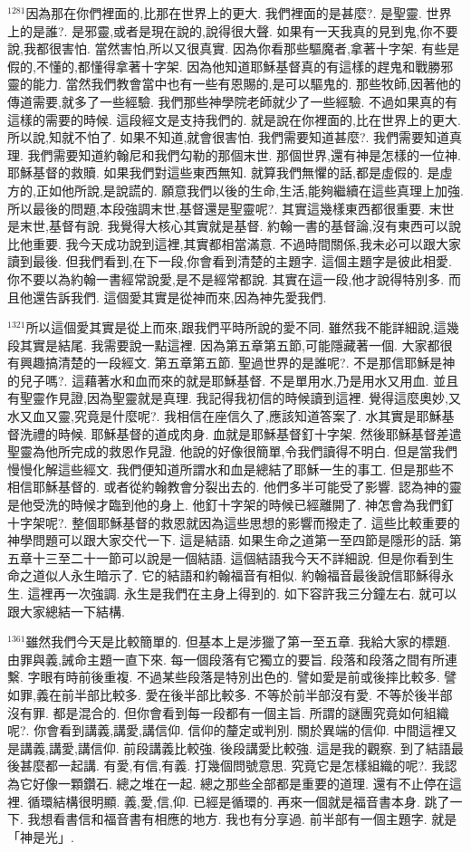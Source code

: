 \documentclass{book}
\begin{document}
$^{1281}$因為那在你們裡面的,比那在世界上的更大.
我們裡面的是甚麼?.
是聖靈.
世界上的是誰?.
是邪靈,或者是現在說的,說得很大聲.
如果有一天我真的見到鬼,你不要說,我都很害怕.
當然害怕,所以又很真實.
因為你看那些驅魔者,拿著十字架.
有些是假的,不懂的,都懂得拿著十字架.
因為他知道耶穌基督真的有這樣的趕鬼和戰勝邪靈的能力.
當然我們教會當中也有一些有恩賜的,是可以驅鬼的.
那些牧師,因著他的傳道需要,就多了一些經驗.
我們那些神學院老師就少了一些經驗.
不過如果真的有這樣的需要的時候.
這段經文是支持我們的.
就是說在你裡面的,比在世界上的更大.
所以說,知就不怕了.
如果不知道,就會很害怕.
我們需要知道甚麼?.
我們需要知道真理.
我們需要知道約翰尼和我們勾勒的那個末世.
那個世界,還有神是怎樣的一位神.
耶穌基督的救贖.
如果我們對這些東西無知.
就算我們無懼的話,都是虛假的.
是虛方的,正如他所說,是說謊的.
願意我們以後的生命,生活,能夠繼續在這些真理上加強.
所以最後的問題,本段強調末世,基督還是聖靈呢?.
其實這幾樣東西都很重要.
末世是末世,基督有說.
我覺得大核心其實就是基督.
約翰一書的基督論,沒有東西可以說比他重要.
我今天成功說到這裡,其實都相當滿意.
不過時間關係,我未必可以跟大家讀到最後.
但我們看到,在下一段,你會看到清楚的主題字.
這個主題字是彼此相愛.
你不要以為約翰一書經常說愛,是不是經常都說.
其實在這一段,他才說得特別多.
而且他還告訴我們.
這個愛其實是從神而來,因為神先愛我們.

$^{1321}$所以這個愛其實是從上而來,跟我們平時所說的愛不同.
雖然我不能詳細說,這幾段其實是結尾.
我需要說一點這裡.
因為第五章第五節,可能隱藏著一個.
大家都很有興趣搞清楚的一段經文.
第五章第五節.
聖過世界的是誰呢?.
不是那信耶穌是神的兒子嗎?.
這藉著水和血而來的就是耶穌基督.
不是單用水,乃是用水又用血.
並且有聖靈作見證,因為聖靈就是真理.
我記得我初信的時候讀到這裡.
覺得這麼奧妙,又水又血又靈,究竟是什麼呢?.
我相信在座信久了,應該知道答案了.
水其實是耶穌基督洗禮的時候.
耶穌基督的道成肉身.
血就是耶穌基督釘十字架.
然後耶穌基督差遣聖靈為他所完成的救恩作見證.
他說的好像很簡單,令我們讀得不明白.
但是當我們慢慢化解這些經文.
我們便知道所謂水和血是總結了耶穌一生的事工.
但是那些不相信耶穌基督的.
或者從約翰教會分裂出去的.
他們多半可能受了影響.
認為神的靈是他受洗的時候才臨到他的身上.
他釘十字架的時候已經離開了.
神怎會為我們釘十字架呢?.
整個耶穌基督的救恩就因為這些思想的影響而撥走了.
這些比較重要的神學問題可以跟大家交代一下.
這是結語.
如果生命之道第一至四節是隱形的話.
第五章十三至二十一節可以說是一個結語.
這個結語我今天不詳細說.
但是你看到生命之道似人永生暗示了.
它的結語和約翰福音有相似.
約翰福音最後說信耶穌得永生.
這裡再一次強調.
永生是我們在主身上得到的.
如下容許我三分鐘左右.
就可以跟大家總結一下結構.

$^{1361}$雖然我們今天是比較簡單的.
但基本上是涉獵了第一至五章.
我給大家的標題.
由罪與義,誡命主題一直下來.
每一個段落有它獨立的要旨.
段落和段落之間有所連繫.
字眼有時前後重複.
不過某些段落是特別出色的.
譬如愛是前或後摔比較多.
譬如罪,義在前半部比較多.
愛在後半部比較多.
不等於前半部沒有愛.
不等於後半部沒有罪.
都是混合的.
但你會看到每一段都有一個主旨.
所謂的謎團究竟如何組織呢?.
你會看到講義,講愛,講信仰.
信仰的釐定或判別.
關於異端的信仰.
中間這裡又是講義,講愛,講信仰.
前段講義比較強.
後段講愛比較強.
這是我的觀察.
到了結語最後甚麼都一起講.
有愛,有信,有義.
打幾個問號意思.
究竟它是怎樣組織的呢?.
我認為它好像一顆鑽石.
總之堆在一起.
總之那些全部都是重要的道理.
還有不止停在這裡.
循環結構很明顯.
義,愛,信,仰.
已經是循環的.
再來一個就是福音書本身.
跳了一下.
我想看書信和福音書有相應的地方.
我也有分享過.
前半部有一個主題字.
就是「神是光」.
\end{document}
